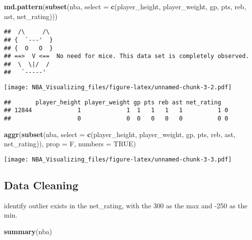 \documentclass[
]{book}
\newenvironment{Shaded}{\begin{snugshade}}{\end{snugshade}}
\newcommand{\AttributeTok}[1]{\textcolor[rgb]{0.13,0.29,0.53}{#1}}
\newcommand{\ConstantTok}[1]{\textcolor[rgb]{0.56,0.35,0.01}{#1}}
\newcommand{\FunctionTok}[1]{\textcolor[rgb]{0.13,0.29,0.53}{\textbf{#1}}}
\newcommand{\NormalTok}[1]{#1}
\begin{document}
\begin{Shaded}
\begin{Highlighting}[]
\FunctionTok{md.pattern}\NormalTok{(}\FunctionTok{subset}\NormalTok{(nba, }\AttributeTok{select =} \FunctionTok{c}\NormalTok{(player\_height,}
\NormalTok{    player\_weight, gp, pts, reb, ast, net\_rating)))}
\end{Highlighting}
\end{Shaded}

\begin{verbatim}
##  /\     /\
## {  `---'  }
## {  O   O  }
## ==>  V <==  No need for mice. This data set is completely observed.
##  \  \|/  /
##   `-----'
\end{verbatim}

\texttt{[image: NBA\_Visualizing\_files/figure-latex/unnamed-chunk-3-2.pdf]}

\begin{verbatim}
##       player_height player_weight gp pts reb ast net_rating  
## 12844             1             1  1   1   1   1          1 0
##                   0             0  0   0   0   0          0 0
\end{verbatim}

\begin{Shaded}
\begin{Highlighting}[]
\FunctionTok{aggr}\NormalTok{(}\FunctionTok{subset}\NormalTok{(nba, }\AttributeTok{select =} \FunctionTok{c}\NormalTok{(player\_height,}
\NormalTok{    player\_weight, gp, pts, reb, ast, net\_rating)),}
    \AttributeTok{prop =}\NormalTok{ F, }\AttributeTok{numbers =} \ConstantTok{TRUE}\NormalTok{)}
\end{Highlighting}
\end{Shaded}

\texttt{[image: NBA\_Visualizing\_files/figure-latex/unnamed-chunk-3-3.pdf]}

\hypertarget{data-cleaning}{%
\subsection{Data Cleaning}\label{data-cleaning}}

identify outlier exists in the net\_rating, with the 300 as the max and -250 as the min.

\begin{Shaded}
\begin{Highlighting}[]
\FunctionTok{summary}\NormalTok{(nba)}
\end{Highlighting}
\end{Shaded}
\end{document}
